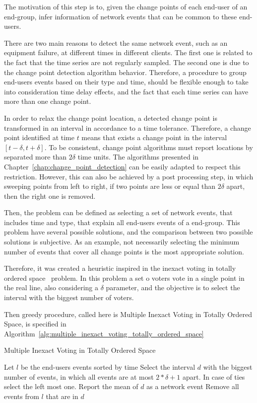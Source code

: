 The motivation of this step is to, given the change points of each end-user of
an end-group, infer information of network events that can be common to these
end-users.

There are two main reasons to detect the same network event, such as an
equipment failure, at different times in different clients. The first one is
related to the fact that the time series are not regularly sampled. The second
one is due to the change point detection algorithm behavior.
Therefore, a procedure to group end-users events based on their type and time,
should be flexible enough to take into consideration time delay effects, and
the fact that each time series can have more than one change point.

In order to relax the change point location, a detected change point is
transformed in an interval in accordance to a time tolerance.
Therefore, a change point identified at
time $t$ means that exists a change point in the interval
$[t - \delta, t + \delta]$. To be consistent,
change point algorithms must report locations by separated more than
$2 \delta$ time units. The algorithms presented in
Chapter~\ref{chap:change_point_detection}
can be easily adapted to respect this restriction. However, this can also be
achieved by a post processing step, in which sweeping points from left to right,
if two
points are less or equal than $2 \delta$ apart, then the right one is removed.

Then, the problem can be defined as selecting a set of network events, that
includes time and type, that explain all end-users events of a end-group. This
problem have several possible solutions, and the comparison between two
possible solutions is subjective. As an example, not
necessarily selecting the minimum number of events that cover all change
points is the most appropriate solution.

Therefore, it was created a heuristic inspired in the inexact voting in totally
ordered space~\cite{voting_algorithms} problem. In this problem a set o voters
vote in a single point in the real line, also considering a $\delta$ parameter,
and the objective is to
select the interval with the biggest number of voters.

Then greedy procedure, called here is Multiple Inexact Voting in Totally
Ordered Space, is specified in
Algorithm~\ref{alg:multiple_inexact_voting_totally_ordered_space}

\begin{algorithm}[H]
\caption{Multiple Inexact Voting in Totally Ordered Space}
\label{alg:multiple_inexact_voting_totally_ordered_space}
    \begin{algorithmic}[1]
        \State{} Let $l$ be the end-users events sorted by time
            \State{} Select the interval $d$ with the biggest number of events,
            in which all events are at most $2 * \delta + 1$ apart.
            In case of ties select the left most one. Report the mean of $d$ as
            a network event
            \State{} Remove all events from $l$ that are in $d$
        \EndWhile{}
    \end{algorithmic}
\end{algorithm}

